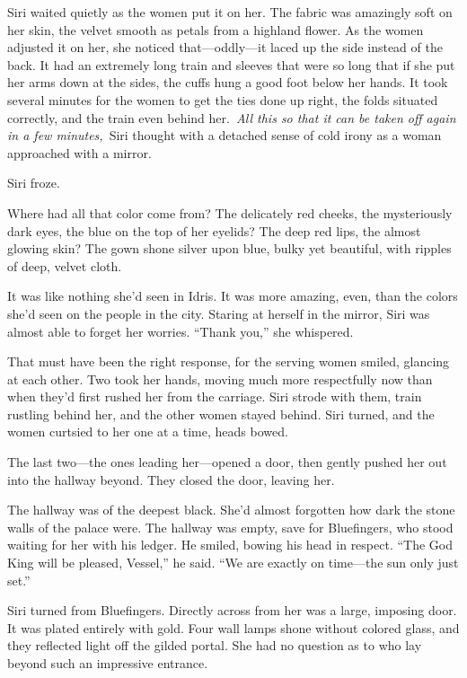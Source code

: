 Siri waited quietly as the women put it on her. The fabric was amazingly soft on her skin, the velvet smooth as petals from a highland flower. As the women adjusted it on her, she noticed that—oddly—it laced up the side instead of the back. It had an extremely long train and sleeves that were so long that if she put her arms down at the sides, the cuffs hung a good foot below her hands. It took several minutes for the women to get the ties done up right, the folds situated correctly, and the train even behind her.~\textit{All this so that it can be taken off again in a few minutes,}~Siri thought with a detached sense of cold irony as a woman approached with a mirror.

Siri froze.

Where had all that color come from? The delicately red cheeks, the mysteriously dark eyes, the blue on the top of her eyelids? The deep red lips, the almost glowing skin? The gown shone silver upon blue, bulky yet beautiful, with ripples of deep, velvet cloth.

It was like nothing she’d seen in Idris. It was more amazing, even, than the colors she’d seen on the people in the city. Staring at herself in the mirror, Siri was almost able to forget her worries. “Thank you,” she whispered.

That must have been the right response, for the serving women smiled, glancing at each other. Two took her hands, moving much more respectfully now than when they’d first rushed her from the carriage. Siri strode with them, train rustling behind her, and the other women stayed behind. Siri turned, and the women curtsied to her one at a time, heads bowed.

The last two—the ones leading her—opened a door, then gently pushed her out into the hallway beyond. They closed the door, leaving her.

The hallway was of the deepest black. She’d almost forgotten how dark the stone walls of the palace were. The hallway was empty, save for Bluefingers, who stood waiting for her with his ledger. He smiled, bowing his head in respect. “The God King will be pleased, Vessel,” he said. “We are exactly on time—the sun only just set.”

Siri turned from Bluefingers. Directly across from her was a large, imposing door. It was plated entirely with gold. Four wall lamps shone without colored glass, and they reflected light off the gilded portal. She had no question as to who lay beyond such an impressive entrance.

